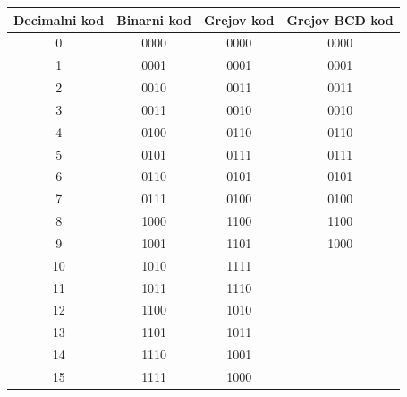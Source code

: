 \begin{tabular}{cccc}\toprule Decimalni kod & Binarni kod & Grejov kod & Grejov BCD kod\\\midrule
0 & 0000 & \textcolor{DEcrvena}{0000} & \textcolor{DEcrvena}{0000}\\
1 & 0001 & 0001 & 0001\\
2 & 0010 & 0011 & 0011\\
3 & 0011 & 0010 & 0010\\
4 & 0100 & 0110 & 0110\\
5 & 0101 & 0111 & 0111\\
6 & 0110 & 0101 & 0101\\
7 & 0111 & 0100 & 0100\\
8 & 1000 & 1100 & 1100\\
9 & 1001 & 1101 & \textcolor{DEcrvena}{1000}\\
10 & 1010 & 1111 & \\
11 & 1011 & 1110 & \\
12 & 1100 & 1010 & \\
13 & 1101 & 1011 & \\
14 & 1110 & 1001 & \\
15 & 1111 & \textcolor{DEcrvena}{1000} & \\
\bottomrule\end{tabular}
